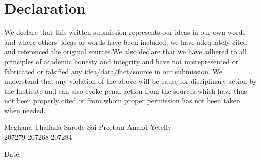 \chapter{Declaration}
We declare that this written submission represents our ideas in our own words and where others' ideas or words have been included, we have adequately cited and referenced the original sources.We also declare that we have adhered to all principles of academic honesty and integrity and have
not misrepresented or fabricated or falsified any idea/data/fact/source in our submission. We
understand that any violation of the above will be cause for disciplinary action by the Institute
and can also evoke penal action from the sources which have thus not been properly cited or
from whom proper permission has not been taken when needed. \\
\vspace{10em}
\begin {flushleft}


Meghana Thallada \hspace{1.5cm} Sarode Sai Preetam \hspace{1.5cm} Anand Yetelly \\
207279 \hspace{3.5cm} 207268 \hspace{3.8cm} 207284 \hspace{1cm}
\date{\today}
\end{flushleft}
Date:
